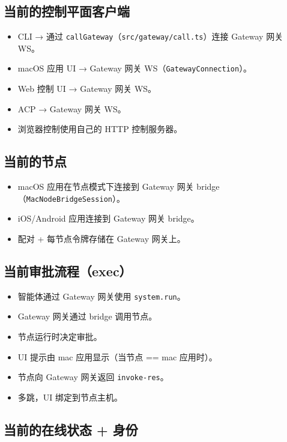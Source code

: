 \subsection{当前的控制平面客户端}


\begin{itemize}
  \item CLI → 通过 \texttt{callGateway}（\texttt{src/gateway/call.ts}）连接 Gateway 网关 WS。
  \item macOS 应用 UI → Gateway 网关 WS（\texttt{GatewayConnection}）。
  \item Web 控制 UI → Gateway 网关 WS。
  \item ACP → Gateway 网关 WS。
  \item 浏览器控制使用自己的 HTTP 控制服务器。
\end{itemize}


\subsection{当前的节点}


\begin{itemize}
  \item macOS 应用在节点模式下连接到 Gateway 网关 bridge（\texttt{MacNodeBridgeSession}）。
  \item iOS/Android 应用连接到 Gateway 网关 bridge。
  \item 配对 + 每节点令牌存储在 Gateway 网关上。
\end{itemize}


\subsection{当前审批流程（exec）}


\begin{itemize}
  \item 智能体通过 Gateway 网关使用 \texttt{system.run}。
  \item Gateway 网关通过 bridge 调用节点。
  \item 节点运行时决定审批。
  \item UI 提示由 mac 应用显示（当节点 == mac 应用时）。
  \item 节点向 Gateway 网关返回 \texttt{invoke-res}。
  \item 多跳，UI 绑定到节点主机。
\end{itemize}


\subsection{当前的在线状态 + 身份}


